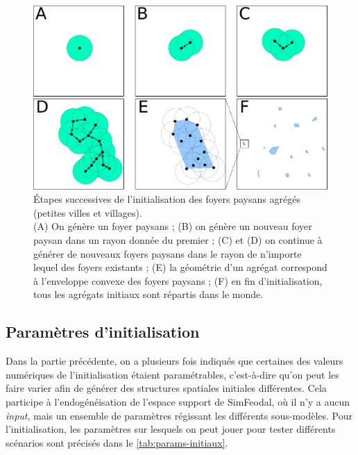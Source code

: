 \begin{figure}[H]
	\centering
	\includegraphics[width=.98\linewidth]{img/init_fp.pdf}
	\caption{Étapes successives de l'initialisation des foyers paysans agrégés (petites villes et villages).\\
	(A) On génère un foyer paysans ;
	(B) on génère un nouveau foyer paysan dans un rayon donnée du premier ;
	(C) et (D) on continue à générer de nouveaux foyers paysans dans le rayon de n'importe lequel des foyers existants ;
	(E) la géométrie d'un agrégat correspond à l'enveloppe convexe des foyers paysans ;
	(F) en fin d'initialisation, tous les agrégats initiaux sont répartis dans le monde.}
	\label{fig:init-fp}
\end{figure}



\subsection{Paramètres d'initialisation}

Dans la partie précédente, on a plusieurs fois indiqués que certaines des valeurs numériques de l'initialisation étaient paramétrables, c'est-à-dire qu'on peut les faire varier afin de générer des structures spatiales initiales différentes.
Cela participe à l'endogénéisation de l'espace support de SimFeodal, où il n'y a aucun \og \textit{input}\fg{}, mais un ensemble de paramètres régissant les différents sous-modèles.
Pour l'initialisation, les paramètres sur lesquels on peut jouer pour tester différents scénarios sont précisés dans le \cref{tab:params-initiaux}.


